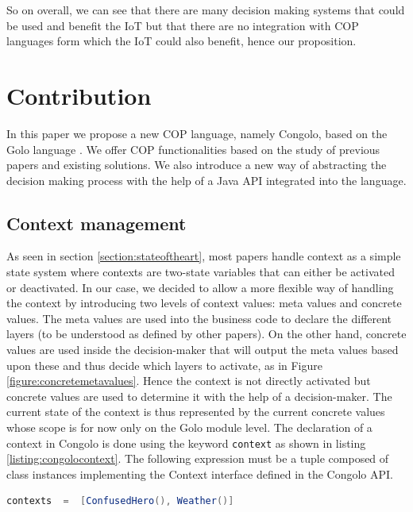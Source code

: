 \documentclass[a4paper]{article}
\begin{document}
So on overall, we can see that there are many decision making systems that could be used and benefit the IoT but that there are no integration with COP languages form which the IoT could also benefit, hence our proposition.

\goodbreak
  \section{Contribution}

\label{section:contribution}

In this paper we propose a new COP language, namely Congolo, based on the Golo language \cite{ponge_golo_2013}. We offer COP functionalities based on the study of previous papers and existing solutions. We also introduce a new way of abstracting the decision making process with the help of a Java API integrated into the language.
\subsection{Context management}
\label{subsection:contextmanagement}

As seen in section \ref{section:stateoftheart}, most papers handle context as a simple state system where contexts are two-state variables that can either be activated or deactivated. In our case, we decided to allow a more flexible way of handling the context by introducing two levels of context values: meta values and concrete values. The meta values are used into the business code to declare the different layers (to be understood as defined by other papers). On the other hand, concrete values are used inside the decision-maker that will output the meta values based upon these and thus decide which layers to activate, as in Figure \ref{figure:concretemetavalues}. Hence the context is not directly activated but concrete values are used to determine it with the help of a decision-maker. The current state of the context is thus represented by the current concrete values whose scope is for now only on the Golo module level. The declaration of a context in Congolo is done using the keyword \lstinline|context| as shown in listing \ref{listing:congolocontext}. The following expression must be a tuple composed of class instances implementing the Context interface defined in the Congolo API.

\begin{lstlisting}[float, language=Java, caption=Congolo context example, label={listing:congolocontext}]
contexts  =  [ConfusedHero(), Weather()]
\end{lstlisting}
\end{document}
